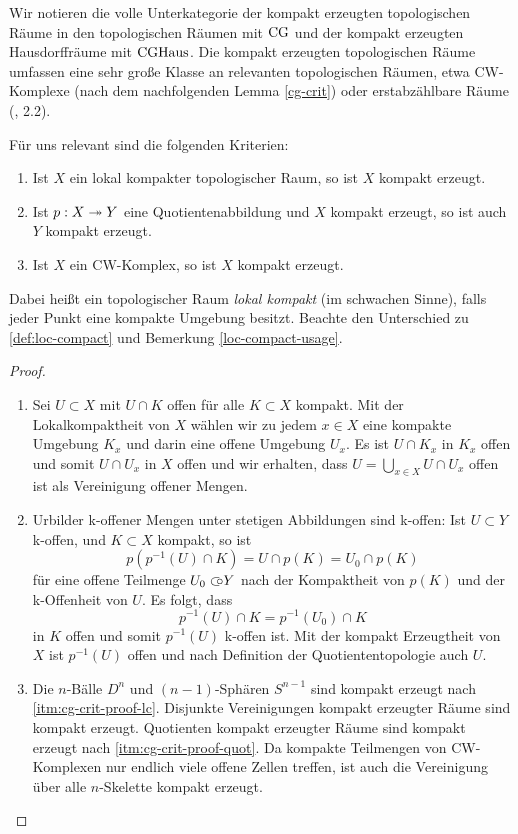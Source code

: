 Wir notieren die volle Unterkategorie der kompakt
erzeugten topologischen Räume in den topologischen Räumen mit $\operatorname{CG}$
und der kompakt erzeugten Hausdorffräume mit $\operatorname{CGHaus}$. Die kompakt
erzeugten topologischen Räume umfassen eine sehr große Klasse an
relevanten topologischen Räumen, etwa CW-Komplexe (nach dem
nachfolgenden Lemma \ref{cg-crit}) oder erstabzählbare Räume
(\cite{Steenrod}, 2.2).

Für uns relevant sind die folgenden Kriterien:
\begin{lemma} \label{cg-crit}
  \begin{enumerate}[label=(\roman*)]
    \item \label{itm:cg-crit-lc} Ist $X$ ein lokal kompakter
      topologischer Raum, so ist $X$ kompakt erzeugt.
    \item \label{itm:cg-crit-quot} Ist $p: X \twoheadrightarrow Y$ eine
      Quotientenabbildung und $X$ kompakt erzeugt, so ist auch $Y$
      kompakt erzeugt.
     \item \label{itm:cg-crit-cw} Ist $X$ ein CW-Komplex, so ist $X$
       kompakt erzeugt.
  \end{enumerate}
\end{lemma}
Dabei heißt ein topologischer Raum \emph{lokal kompakt} (im schwachen
Sinne), falls jeder Punkt eine kompakte Umgebung besitzt. Beachte den
Unterschied zu \ref{def:loc-compact} und Bemerkung
\ref{loc-compact-usage}.
\begin{proof}
  \begin{enumerate}[label=(\roman*)]
    \item \label{itm:cg-crit-proof-lc} Sei $U \subset X$ mit $U \cap
      K$ offen für alle $K \subset X$ kompakt. Mit der
      Lokalkompaktheit von $X$ wählen wir zu jedem $x \in X$ eine
      kompakte Umgebung $K_x$ und darin eine offene Umgebung $U_x$. Es
      ist $U \cap K_x$ in $K_x$ offen und somit $U \cap U_x$ in $X$
      offen und wir erhalten, dass $U = \bigcup_{x \in X} U \cap U_x$
      offen ist als Vereinigung offener Mengen.
    \item \label{itm:cg-crit-proof-quot} Urbilder k-offener Mengen
      unter stetigen Abbildungen sind k-offen: Ist $U \subset Y$
      k-offen, und $K \subset X$ kompakt, so ist
      \[p(p^{-1}(U) \cap K) = U \cap p(K) = U_0 \cap p(K) \]
      für eine offene Teilmenge $U_0 \subset\kern-0.58em\circ Y$ nach der Kompaktheit von
      $p(K)$ und der k-Offenheit von $U$. Es folgt, dass
      \[ p^{-1}(U) \cap K = p^{-1}(U_0) \cap K \]
      in $K$ offen und somit $p^{-1}(U)$ k-offen ist. Mit der kompakt
      Erzeugtheit von $X$ ist $p^{-1}(U)$ offen und nach Definition
      der Quotiententopologie auch $U$.
    \item Die $n$-Bälle $D^n$ und $(n-1)$-Sphären $S^{n-1}$ sind
      kompakt erzeugt nach \ref{itm:cg-crit-proof-lc}. Disjunkte
      Vereinigungen kompakt erzeugter Räume sind kompakt
      erzeugt. Quotienten kompakt erzeugter Räume sind kompakt erzeugt
      nach \ref{itm:cg-crit-proof-quot}. Da kompakte Teilmengen von
      CW-Komplexen nur endlich viele offene Zellen treffen, ist auch
      die Vereinigung über alle $n$-Skelette kompakt erzeugt.
  \end{enumerate}
\end{proof}

